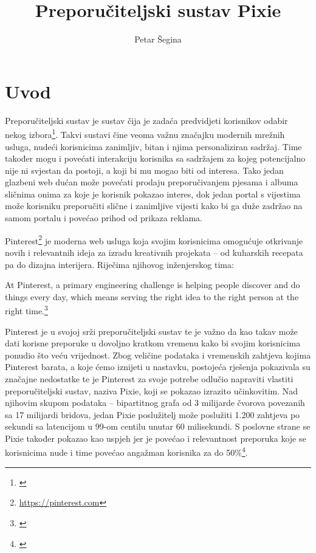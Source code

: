 \documentclass[times, utf8, seminar]{fer}
\begin{document}
\title{Preporučiteljski sustav Pixie}

\author{Petar Šegina}


\maketitle

\tableofcontents

\chapter{Uvod}

Preporučiteljski sustav je sustav čija je zadaća predvidjeti korisnikov odabir nekog izbora\footnote{\cite{mmd}}. Takvi sustavi čine veoma važnu značajku modernih mrežnih usluga, nudeći korisnicima zanimljiv, bitan i njima personaliziran sadržaj. Time također mogu i povećati interakciju korisnika sa sadržajem za kojeg potencijalno nije ni svjestan da postoji, a koji bi mu mogao biti od interesa. Tako jedan glazbeni web dućan može povećati prodaju preporučivanjem pjesama i albuma sličnima onima za koje je korisnik pokazao interes, dok jedan portal s vijestima može korisniku preporučiti slične i zanimljive vijesti kako bi ga duže zadržao na samom portalu i povećao prihod od prikaza reklama.

Pinterest\footnote{\url{https://pinterest.com}} je moderna web usluga koja svojim korisnicima omogućuje otkrivanje novih i relevantnih ideja za izradu kreativnih projekata -- od kuharskih recepata pa do dizajna interijera. Riječima njihovog inženjerskog tima:

\begin{displayquote}
		  At Pinterest, a primary engineering challenge is helping people discover and do things every day, which means serving the right idea to the right person at the right time.\footnote{\cite{medium-article}}
\end{displayquote}

Pinterest je u svojoj srži preporučiteljski sustav te je važno da kao takav može dati korisne preporuke u dovoljno kratkom vremenu kako bi svojim korisnicima ponudio što veću vrijednost. Zbog veličine podataka i vremenskih zahtjeva kojima Pinterest barata, a koje ćemo iznijeti u nastavku, postojeća rješenja pokazivala su značajne nedostatke te je Pinterest za svoje potrebe odlučio napraviti vlastiti preporučiteljski sustav, naziva Pixie, koji se pokazao izrazito učinkovitim. Nad njihovim skupom podataka -- bipartitnog grafa od 3 milijarde čvorova povezanih sa 17 milijardi bridova, jedan Pixie poslužitelj može poslužiti 1.200 zahtjeva po sekundi sa latencijom u 99-om centilu unutar 60 milisekundi. S poslovne strane se Pixie također pokazao kao uspjeh jer je povećao i relevantnost preporuka koje se korisnicima nude i time povećao angažman korisnika za do 50\%\footnote{\cite{DBLP:journals/corr/abs-1711-07601}}.
\end{document}
